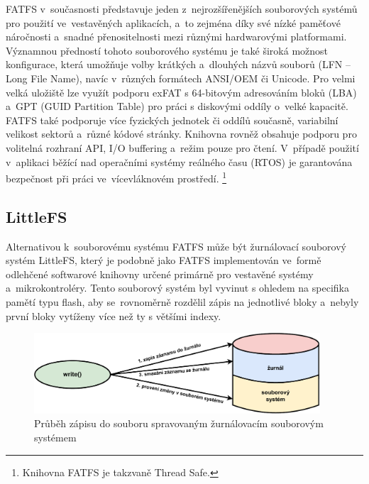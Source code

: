 FATFS v~současnosti představuje jeden z~nejrozšířenějších souborových systémů pro použití ve~vestavěných aplikacích, a~to zejména díky své nízké paměťové náročnosti a~snadné přenositelnosti mezi různými hardwarovými platformami. Významnou předností tohoto souborového systému je také široká možnost konfigurace, která umožňuje volby krátkých a~dlouhých názvů souborů (LFN -- Long File Name), navíc v~různých formátech ANSI/OEM či Unicode. Pro velmi velká uložiště lze využít podporu exFAT s 64-bitovým adresováním bloků (LBA) a~GPT (GUID Partition Table) pro práci s diskovými oddíly o~velké kapacitě. FATFS také podporuje více fyzických jednotek či oddílů současně, variabilní velikost sektorů a~různé kódové stránky. Knihovna rovněž obsahuje podporu pro volitelná rozhraní API, I/O buffering a~režim pouze pro čtení. V~případě použití v~aplikaci běžící nad operačními systémy reálného času (RTOS) je garantována bezpečnost při práci ve~vícevláknovém prostředí. \footnote{Knihovna FATFS je takzvaně Thread Safe.}~\cite{elm_fat_filesystem_module}


\subsection{LittleFS}
\label{littlefs}
Alternativou k~souborovému systému FATFS může být žurnálovací souborový systém LittleFS, který je podobně jako FATFS implementován ve~formě odlehčené softwarové knihovny určené primárně pro vestavěné systémy a~mikrokontroléry.  Tento souborový systém byl vyvinut s ohledem na specifika pamětí typu flash, aby se~rovnoměrně rozdělil zápis na jednotlivé bloky a~nebyly první bloky vytíženy více než ty s většími indexy.~\cite{nxp_the_design_of_the_little_filesystem}

\begin{figure}[h]
    \centering
    \includegraphics[width=0.95\textwidth]{obrazky-figures/journaling-cz.pdf}
    
    \caption{Průběh zápisu do souboru spravovaným žurnálovacím souborovým systémem~\cite{architecture_and_design_of_the_linux_storage_stack}}
    \label{fig:journaling}
\end{figure}

